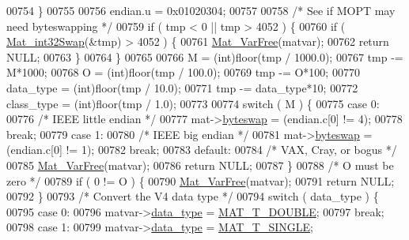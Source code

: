 \begin{DoxyCode}
{{{00754     \}
00755 
00756     endian.u = 0x01020304;
00757 
00758     \textcolor{comment}{/* See if MOPT may need byteswapping */}
00759     \textcolor{keywordflow}{if} ( tmp < 0 || tmp > 4052 ) \{
00760         \textcolor{keywordflow}{if} ( \hyperlink{endian_8c_a2e0153996243f0a34df9a5286087cfa3}{Mat\_int32Swap}(&tmp) > 4052 ) \{
00761             \hyperlink{group___m_a_t_ga1d14716f7450530fd1c9d02413787f0e}{Mat\_VarFree}(matvar);
00762             \textcolor{keywordflow}{return} NULL;
00763         \}
00764     \}
00765 
00766     M = (int)floor(tmp / 1000.0);
00767     tmp -= M*1000;
00768     O = (int)floor(tmp / 100.0);
00769     tmp -= O*100;
00770     data\_type = (int)floor(tmp / 10.0);
00771     tmp -= data\_type*10;
00772     class\_type = (int)floor(tmp / 1.0);
00773 
00774     \textcolor{keywordflow}{switch} ( M ) \{
00775         \textcolor{keywordflow}{case} 0:
00776             \textcolor{comment}{/* IEEE little endian */}
00777             mat->\hyperlink{struct__mat__t_a99d207977af5e04941ace56d71817a40}{byteswap} = (endian.c[0] != 4);
00778             \textcolor{keywordflow}{break};
00779         \textcolor{keywordflow}{case} 1:
00780             \textcolor{comment}{/* IEEE big endian */}
00781             mat->\hyperlink{struct__mat__t_a99d207977af5e04941ace56d71817a40}{byteswap} = (endian.c[0] != 1);
00782             \textcolor{keywordflow}{break};
00783         \textcolor{keywordflow}{default}:
00784             \textcolor{comment}{/* VAX, Cray, or bogus */}
00785             \hyperlink{group___m_a_t_ga1d14716f7450530fd1c9d02413787f0e}{Mat\_VarFree}(matvar);
00786             \textcolor{keywordflow}{return} NULL;
00787     \}
00788     \textcolor{comment}{/* O must be zero */}
00789     \textcolor{keywordflow}{if} ( 0 != O ) \{
00790         \hyperlink{group___m_a_t_ga1d14716f7450530fd1c9d02413787f0e}{Mat\_VarFree}(matvar);
00791         \textcolor{keywordflow}{return} NULL;
00792     \}
00793     \textcolor{comment}{/* Convert the V4 data type */}
00794     \textcolor{keywordflow}{switch} ( data\_type ) \{
00795         \textcolor{keywordflow}{case} 0:
00796             matvar->\hyperlink{group___m_a_t_ab6aafe9bd77f0f077852593dec438144}{data\_type} = \hyperlink{group___m_a_t_ggacf7b3b879282b7ab3a51190e49bf3453a31e721ecf7e188196f83c32838288797}{MAT\_T\_DOUBLE};
00797             \textcolor{keywordflow}{break};
00798         \textcolor{keywordflow}{case} 1:
00799             matvar->\hyperlink{group___m_a_t_ab6aafe9bd77f0f077852593dec438144}{data\_type} = \hyperlink{group___m_a_t_ggacf7b3b879282b7ab3a51190e49bf3453a3a3657d40e9212c923d9b9d03531b64c}{MAT\_T\_SINGLE};
}}}
\end{DoxyCode}
